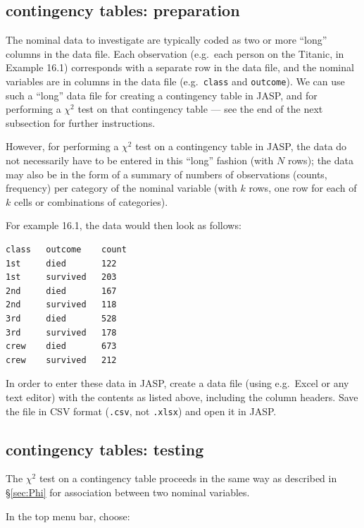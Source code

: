 \documentclass[
]{book}
\begin{document}
\hypertarget{contingency-tables-preparation-1}{%
\subsection{contingency tables: preparation}\label{contingency-tables-preparation-1}}

The nominal data to investigate are typically coded as two or more ``long'' columns in the data file. Each observation (e.g.~each person on the Titanic, in Example 16.1) corresponds with a separate row in the data file, and the nominal variables are in columns in the data file (e.g.~\texttt{class} and \texttt{outcome}). We can use such a ``long'' data file for creating a contingency table in JASP, and for performing a \(\chi^2\) test on that contingency table --- see the end of the next subsection for further instructions.

However, for performing a \(\chi^2\) test on a contingency table in JASP, the data do not necessarily have to be entered in this ``long'' fashion (with \(N\) rows); the data may also be in the form of a summary of numbers of observations (counts, frequency) per category of the nominal variable (with \(k\) rows, one row for each of \(k\) cells or combinations of categories).

For example 16.1, the data would then look as follows:

\begin{verbatim}
class   outcome    count
1st     died       122
1st     survived   203
2nd     died       167
2nd     survived   118
3rd     died       528
3rd     survived   178
crew    died       673
crew    survived   212
\end{verbatim}

In order to enter these data in JASP, create a data file (using e.g.~Excel or any text editor) with the contents as listed above, including the column headers. Save the file in CSV format (\texttt{.csv}, not \texttt{.xlsx}) and open it in JASP.

\hypertarget{contingency-tables-testing-1}{%
\subsection{contingency tables: testing}\label{contingency-tables-testing-1}}

The \(\chi^2\) test on a contingency table proceeds in the same way as described in
§\ref{sec:Phi} for association between two nominal variables.

In the top menu bar, choose:
\end{document}
